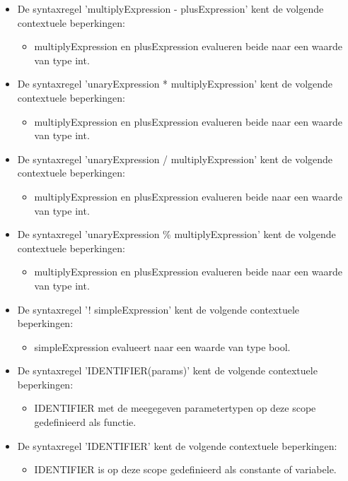 \begin{itemize}
\begin{itemize}
            \end{itemize}
        \item De syntaxregel 'multiplyExpression - plusExpression' kent de volgende contextuele beperkingen:
            \begin{itemize}
             \item multiplyExpression en plusExpression evalueren beide naar een waarde van type int.
            \end{itemize}
        \item De syntaxregel 'unaryExpression * multiplyExpression' kent de volgende contextuele beperkingen:
            \begin{itemize}
            \item multiplyExpression en plusExpression evalueren beide naar een waarde van type int.
            \end{itemize}
        \item De syntaxregel 'unaryExpression / multiplyExpression' kent de volgende contextuele beperkingen:
            \begin{itemize}
            \item multiplyExpression en plusExpression evalueren beide naar een waarde van type int.
            \end{itemize}
        \item De syntaxregel 'unaryExpression \% multiplyExpression' kent de volgende contextuele beperkingen:
            \begin{itemize}
            \item multiplyExpression en plusExpression evalueren beide naar een waarde van type int.
            \end{itemize}
        \item De syntaxregel '! simpleExpression' kent de volgende contextuele beperkingen:
            \begin{itemize}
            \item simpleExpression evalueert naar een waarde van type bool.
            \end{itemize}
        \item De syntaxregel 'IDENTIFIER(params)' kent de volgende contextuele beperkingen:
            \begin{itemize}
            \item IDENTIFIER met de meegegeven parametertypen op deze scope gedefinieerd als functie.
            \end{itemize}
        \item De syntaxregel 'IDENTIFIER' kent de volgende contextuele beperkingen:
            \begin{itemize}
            \item IDENTIFIER is op deze scope gedefinieerd als constante of variabele.
            \end{itemize}
        \end{itemize}
